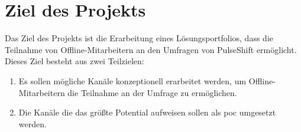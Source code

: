 \section{Ziel des Projekts}

Das Ziel des Projekts ist die Erarbeitung eines Lösungsportfolios, dass die Teilnahme von Offline-Mitarbeitern an den Umfragen von PulseShift ermöglicht. Dieses Ziel besteht aus zwei Teilzielen:

\begin{enumerate}
\item Es sollen mögliche Kanäle konzeptionell erarbeitet werden, um Offline-Mitarbeitern die Teilnahme an der Umfrage zu ermöglichen.
\item Die Kanäle die das größte Potential aufweisen sollen als \gls{poc} umgesetzt werden.
\end{enumerate}


